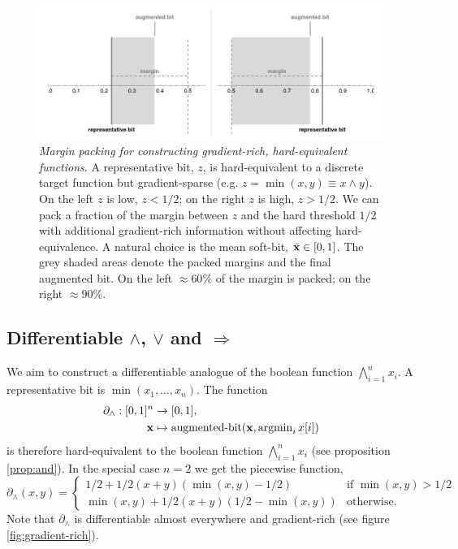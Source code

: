 \documentclass{article} %
\begin{document}
\begin{figure}[t!]
	\centering
	\includegraphics[trim=30pt 5pt 30pt 10pt, clip, width=1.0\textwidth]{margin-trick.png}
	\caption{{\em Margin packing for constructing gradient-rich, hard-equivalent functions}. A representative bit, $z$, is hard-equivalent to a discrete target function but gradient-sparse (e.g. $z=\operatorname{min}(x,y) \equiv x \wedge y$). On the left $z$ is low, $z<1/2$; on the right $z$ is high, $z>1/2$. We can pack a fraction of the margin between $z$ and the hard threshold $1/2$ with additional gradient-rich information without affecting hard-equivalence. A natural choice is the mean soft-bit, $\bar{\bf x} \in [0,1]$. The grey shaded areas denote the packed margins and the final augmented bit. On the left $\approx 60\%$ of the margin is packed; on the right $\approx 90\%$.}
	\label{fig:margin-trick}
\end{figure}

\subsection{Differentiable $\wedge$, $\vee$ and $\Rightarrow$}

We aim to construct a differentiable analogue of the boolean function $\bigwedge_{i=1}^{n} x_i$. A representative bit is $\operatorname{min}(x_{1},\dots,x_{n})$. The function
\begin{equation*}
\begin{aligned}
\partial_{\wedge}: [0,1]^{n} &\to [0,1], \\
{\bf x} &\mapsto \operatorname{augmented-bit}({\bf x}, \operatorname{argmin}\limits_{i} x[i])
\end{aligned}
\end{equation*}
is therefore hard-equivalent to the boolean function $\bigwedge_{i=1}^{n} x_i$ (see proposition \ref{prop:and}). In the special case $n=2$ we get the piecewise function,
\begin{equation*}
\partial_{\wedge}\!(x, y) =
	\begin{cases}
	1/2 + 1/2(x + y)(\operatorname{min}(x,y) - 1/2) & \text{if } \operatorname{min}(x,y) > 1/2 \\
	\operatorname{min}(x,y) + 1/2(x + y)(1/2 - \operatorname{min}(x,y)) & \text{otherwise.}
	\end{cases}
\end{equation*}
Note that $\partial_{\wedge}$ is differentiable almost everywhere and gradient-rich (see figure \ref{fig:gradient-rich}).
\end{document}
